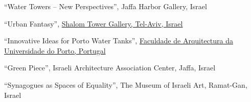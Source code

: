 \begin{tablist}
    \item[2011] \tab \enquote{Water Towers -- New Perspectives}, Jaffa Harbor Gallery, Israel

    \item[2009] \tab \enquote{Urban Fantasy},
    \href{http://urbanica-il.blogspot.com/2009/09/blog-post_09.html}{Shalom Tower Gallery, Tel-Aviv, Israel}

    \item[2008] \tab \enquote{Innovative Ideas for Porto Water Tanks},
    \href{https://competitions.org/2007/06/innovative-ideas-for-porto-water-tanks/}{Faculdade de Arquitectura da Universidade do Porto, Portugal}

    \item[2007] \tab \enquote{Green Piece},
    Israeli Architecture Association Center, Jaffa, Israel

    \item[2005] \tab \enquote{Synagogues as Spaces of Equality},
    The Museum of Israeli Art, Ramat-Gan, Israel

\end{tablist}
